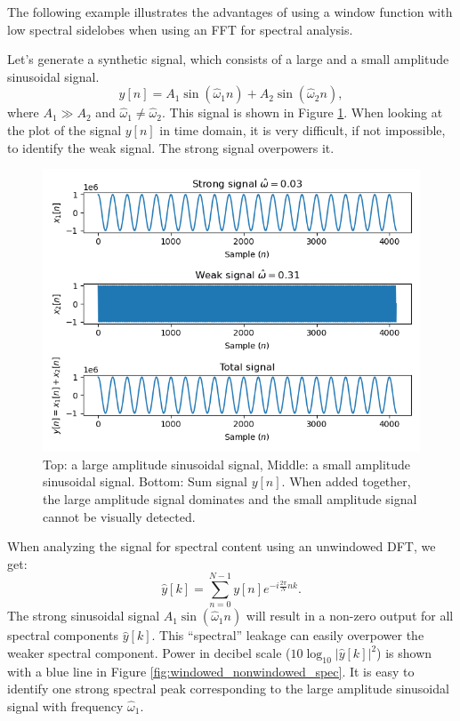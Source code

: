 The following example illustrates the advantages of using a window
function with low spectral sidelobes when using an FFT for spectral
analysis.

Let's generate a synthetic signal, which consists of a large and a small amplitude sinusoidal signal.
\begin{equation}
y[n] = A_1 \sin(\hat{\omega}_1 n) + A_2 \sin(\hat{\omega}_2 n),
\end{equation}
where $A_1 \gg A_2$ and $\hat{\omega}_1 \ne \hat{\omega}_2$. This signal is shown in
Figure \ref{fig:strong_weak_time}. When looking at the plot of the
signal $y[n]$ in time domain, it is very difficult, if not impossible,
to identify the weak signal. The strong signal overpowers it.

\begin{figure}
\begin{center}
\includegraphics[width=\textwidth]{code/022_window_functions/windowed_signals.png}
\end{center}
\caption{Top: a large amplitude sinusoidal signal, Middle: a small amplitude sinusoidal signal. Bottom: Sum signal $y[n]$. When added together, the large amplitude signal dominates and the small amplitude signal cannot be visually detected.}
\label{fig:strong_weak_time}
\end{figure}

When analyzing the signal for spectral content using an unwindowed DFT, we get:
\begin{equation}
\hat{y}[k] = \sum_{n=0}^{N-1} y[n]e^{-i\frac{2\pi}{N}nk}.
\end{equation}
The strong sinusoidal signal $A_1 \sin(\hat{\omega}_1 n)$ will result
in a non-zero output for all spectral components $\hat{y}[k]$. This
``spectral'' leakage can easily overpower the weaker spectral
component. Power in decibel scale ($10 \log_{10}|\hat{y}[k]|^2$) is
shown with a blue line in
Figure \ref{fig:windowed_nonwindowed_spec}. It is easy to identify one
strong spectral peak corresponding to the large amplitude sinusoidal
signal with frequency $\hat{\omega}_1$.

